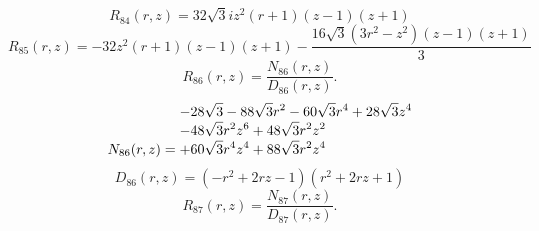 \documentclass[11pt,a4paper]{article}
\begin{document}
\begin{equation}
R_{84}(r,z)=32 \sqrt{3} i z^{2} \left(r + 1\right) \left(z - 1\right) \left(z + 1\right)
\label{eq:cat-rational-84}
\end{equation}
\begin{equation}
R_{85}(r,z)=- 32 z^{2} \left(r + 1\right) \left(z - 1\right) \left(z + 1\right) - \frac{16 \sqrt{3} \left(3 r^{2} - z^{2}\right) \left(z - 1\right) \left(z + 1\right)}{3}
\label{eq:cat-rational-85}
\end{equation}
\begin{equation}
R_{86}(r,z)=\frac{N_{86}(r,z)}{D_{86}(r,z)}.
\label{eq:cat-rational-86}
\end{equation}
\begin{equation}
N_{86}(r,z)=\shortstack[l]{$\displaystyle  - 28 \sqrt{3} - 88 \sqrt{3} r^{2} - 60 \sqrt{3} r^{4} + 28 \sqrt{3} z^{4}$\\
$\displaystyle  - 48 \sqrt{3} r^{2} z^{6} + 48 \sqrt{3} r^{2} z^{2}$\\
$\displaystyle  + 60 \sqrt{3} r^{4} z^{4} + 88 \sqrt{3} r^{2} z^{4}$}
\label{eq:cat-numerator-86}
\end{equation}
\begin{equation}
D_{86}(r,z)=\left(- r^{2} + 2 r z - 1\right) \left(r^{2} + 2 r z + 1\right)
\label{eq:cat-denominator-86}
\end{equation}
\begin{equation}
R_{87}(r,z)=\frac{N_{87}(r,z)}{D_{87}(r,z)}.
\label{eq:cat-rational-87}
\end{equation}
\end{document}
